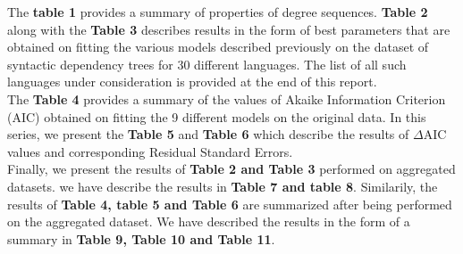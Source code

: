 \documentclass[a4paper]{article}
\begin{document}
 
The \textbf{table 1} provides a summary of properties of degree sequences. \textbf{Table 2} along with the \textbf{Table 3} describes results in the form of best parameters that are obtained on fitting the various models described previously on the dataset of syntactic dependency trees for 30 different languages. The list of all such languages under consideration is provided at the end of this report. \\
The \textbf{Table 4} provides a summary of the values of Akaike Information Criterion (AIC) obtained on fitting the 9 different models on the original data. In this series, we present the \textbf{Table 5} and \textbf{Table 6} which describe the results of $\Delta$AIC values and corresponding Residual Standard Errors.\\
Finally, we present the results of \textbf{Table 2 and Table 3} performed on aggregated datasets. we have describe the results in \textbf{Table 7 and table 8}. 
Similarily, the results of \textbf{Table 4, table 5 and Table 6} are summarized after being performed on the aggregated dataset. We have described the results in the form of a summary in \textbf{Table 9, Table 10 and Table 11}. 
\end{document}
